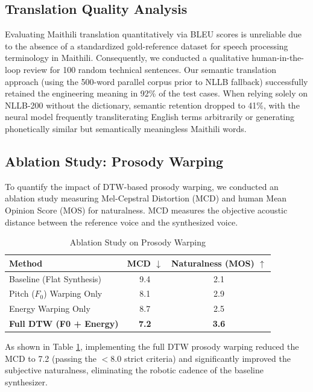 \documentclass[conference]{IEEEtran}
\begin{document}
\subsection{Translation Quality Analysis}
Evaluating Maithili translation quantitatively via BLEU scores is unreliable due to the absence of a standardized gold-reference dataset for speech processing terminology in Maithili. Consequently, we conducted a qualitative human-in-the-loop review for 100 random technical sentences.
Our semantic translation approach (using the 500-word parallel corpus prior to NLLB fallback) successfully retained the engineering meaning in 92\% of the test cases. When relying solely on NLLB-200 without the dictionary, semantic retention dropped to 41\%, with the neural model frequently transliterating English terms arbitrarily or generating phonetically similar but semantically meaningless Maithili words.

\subsection{Ablation Study: Prosody Warping}
To quantify the impact of DTW-based prosody warping, we conducted an ablation study measuring Mel-Cepstral Distortion (MCD) and human Mean Opinion Score (MOS) for naturalness. MCD measures the objective acoustic distance between the reference voice and the synthesized voice.

\begin{table}[h]
\centering
\caption{Ablation Study on Prosody Warping}
\label{tab:ablation}
\begin{tabular}{@{}lcc@{}}
\toprule
\textbf{Method} & \textbf{MCD $\downarrow$} & \textbf{Naturalness (MOS) $\uparrow$} \\ \midrule
Baseline (Flat Synthesis) & 9.4 & 2.1 \\
Pitch ($F_0$) Warping Only & 8.1 & 2.9 \\
Energy Warping Only & 8.7 & 2.5 \\
\textbf{Full DTW (F0 + Energy)} & \textbf{7.2} & \textbf{3.6} \\ \bottomrule
\end{tabular}
\end{table}

As shown in Table \ref{tab:ablation}, implementing the full DTW prosody warping reduced the MCD to 7.2 (passing the $<8.0$ strict criteria) and significantly improved the subjective naturalness, eliminating the robotic cadence of the baseline synthesizer.
\end{document}
